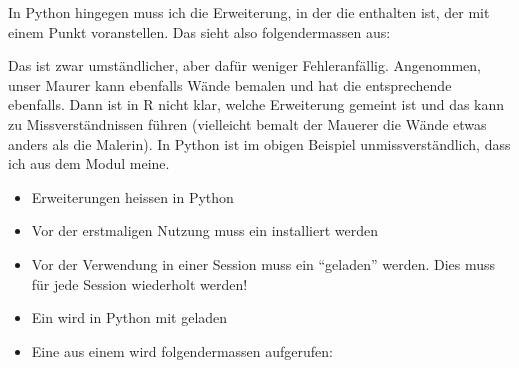 \documentclass[letterpaper,10pt,english]{sphinxmanual}
\begin{document}
\begin{sphinxVerbatim}[commandchars=\\\{\}]
\end{sphinxVerbatim}

In Python hingegen muss ich die Erweiterung, in der die  enthalten ist, der  mit einem Punkt voranstellen. Das sieht also folgendermassen aus:

\begin{sphinxVerbatim}[commandchars=\\\{\}]
\end{sphinxVerbatim}

Das ist zwar umständlicher, aber dafür weniger Fehleranfällig. Angenommen, unser Maurer kann ebenfalls Wände bemalen und hat die entsprechende   ebenfalls. Dann ist in R nicht klar, welche Erweiterung gemeint ist und das kann zu Missverständnissen führen (vielleicht bemalt der Mauerer die Wände etwas anders als die Malerin). In Python ist im obigen Beispiel unmissverständlich, dass ich  aus dem Modul  meine.

\begin{itemize}
\item {} 
Erweiterungen heissen in Python 

\item {} 
Vor der erstmaligen Nutzung muss ein  installiert werden

\item {} 
Vor der Verwendung in einer Session muss ein  “geladen” werden. Dies muss für jede Session wiederholt werden!

\item {} 
Ein  wird in Python mit  geladen

\item {} 
Eine  aus einem  wird folgendermassen aufgerufen: 

\end{itemize}
\end{document}
